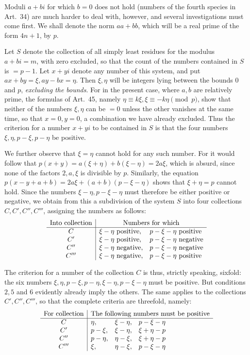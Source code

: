 \newpage
{}
Moduli $a+bi$ for which $b=0$ does not hold (numbers of the fourth species in Art.~34) are much harder to deal with, however, and several investigations must come first. We shall denote the norm $aa+bb$, which will be a real prime of the form $4n+1$, by $p$.

Let $S$ denote the collection of all simply least residues for the modulus $a+bi=m$, with zero excluded, so that the count of the numbers contained in $S$ is $=p-1$. Let $x+yi$ denote any number of this system, and put $ax+by=\xi,ay-bx=\eta$. Then $\xi,\eta$ will be integers lying between the bounds $0$ and $p$, \emph{excluding the bounds}. For in the present case, where $a,b$ are relatively prime, the formulas of Art.~45, namely $\eta\equiv k\xi,\xi\equiv-k\eta\pmod p$, show that neither of the numbers $\xi,\eta$ can be $=0$ unless the other vanishes at the same time, so that $x=0,y=0$, a combination we have already excluded. Thus the criterion for a number $x+yi$ to be contained in $S$ is that the four numbers $\xi,\eta,p-\xi,p-\eta$ be positive.

We further observe that $\xi=\eta$ cannot hold for any such number. For it would follow that $p(x+y)=a(\xi+\eta)+b(\xi-\eta)=2a\xi$, which is absurd, since none of the factors $2,a,\xi$ is divisible by $p$. Similarly, the equation $p(x-y+a+b)=2a\xi+(a+b)(p-\xi-\eta)$ shows that $\xi+\eta=p$ cannot hold. Since the numbers $\xi-\eta,p-\xi-\eta$ must therefore be either positive or negative, we obtain from this a subdivision of the system $S$ into four collections $C,C',C'',C'''$, assigning the numbers as follows:
\[
\begin{array}{c|ll}
\text{Into collection}&\multicolumn{2}{c}{\text{Numbers for which}}\\\hline
C&\xi-\eta\text{ positive},&p-\xi-\eta\text{ positive}\\
C'&\xi-\eta\text{ positive},&p-\xi-\eta\text{ negative}\\
C''&\xi-\eta\text{ negative},&p-\xi-\eta\text{ negative}\\
C'''&\xi-\eta\text{ negative},&p-\xi-\eta\text{ positive}
\end{array}
\]

The criterion for a number of the collection $C$ is thus, strictly speaking, sixfold: the six numbers $\xi,\eta,p-\xi,p-\eta,\xi-\eta,p-\xi-\eta$ must be positive. But conditions $2,5$ and $6$ evidently already imply the others. The same applies to the collections $C',C'',C'''$, so that the complete criteria are threefold, namely:
%
\[
\begin{array}{c|lll}
\text{For collection}&\multicolumn{3}{c}{\text{The following numbers must be positive}}\\\hline
C&\eta,&\xi-\eta,&p-\xi-\eta\\
C'&p-\xi,&\xi-\eta,&\xi+\eta-p\\
C''&p-\eta,&\eta-\xi,&\xi+\eta-p\\
C'''&\xi,&\eta-\xi,&p-\xi-\eta
\end{array}
\]

